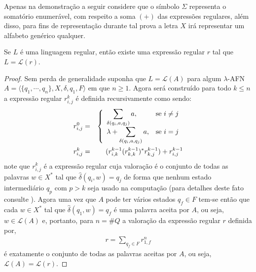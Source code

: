 \newpage
\begin{remark}
	Apenas na demonstração a seguir considere que o símbolo $\Sigma$ representa o somatório enumerável, com respeito a soma $(+)$ das expressões regulares, além disso, para fins de representação durante tal prova a letra $X$ irá representar um alfabeto genérico qualquer.
\end{remark}

\begin{theorem}
	Se $L$ é uma linguagem regular, então existe uma expressão regular $r$ tal que $L = \mathcal{L}(r)$.
\end{theorem}

\begin{proof}
	Sem perda de generalidade suponha que $L = \mathcal{L}(A)$ para algum $\lambda$-AFN $A = \langle \{q_1, \cdots, q_n\}, X, \delta, q_1, F \rangle$ em que $n \geq 1$. Agora será construído para todo $k \leq n$ a expressão regular $r^k_{i,j}$ é definida recursivamente como sendo:
	\begin{eqnarray*}
		r^0_{i,j} & = &  \left\{
		\begin{array}{ll}	
			\displaystyle\sum_{\delta(q_i, a, q_j)} a, & \hbox{se } i \neq j\\
			\displaystyle\lambda + \sum_{\delta(q_i, a, q_j)} a, & \hbox{se } i = j\\
		\end{array}\right.\\
		r^{k}_{i,j} & = & (r^{k-1}_{i,k}(r^{k-1}_{k,k})^* r^{k-1}_{k,j}) + r^{k-1}_{i,j}
	\end{eqnarray*}
	note que $r^{k}_{i,j}$ é a expressão regular cuja valoração é o conjunto de todas as palavras $w \in X^*$ tal que $\widehat{\delta}(q_i, w) = q_j$ de forma que nenhum estado intermediário $q_p$ com $p > k$ seja usado na computação (para detalhes deste fato consulte \cite{benjaLivro2010, hopcroft2008}). Agora uma vez que $A$ pode ter vários estados $q_f \in F$ tem-se então que cada $w \in X^*$ tal que $\widehat{\delta}(q_1, w) = q_f$ é uma palavra aceita por $A$, ou seja, $w \in \mathcal{L}(A)$ e, portanto, para $n = \# Q$ a valoração da expressão regular $r$ definida por, 
	\begin{eqnarray*}
		r = \sum_{q_f \in F} r^n_{1, f}
	\end{eqnarray*}
	é exatamente o conjunto de todas as palavras aceitas por $A$, ou seja, $\mathcal{L}(A) = \mathcal{L}(r)$. 
\end{proof}

